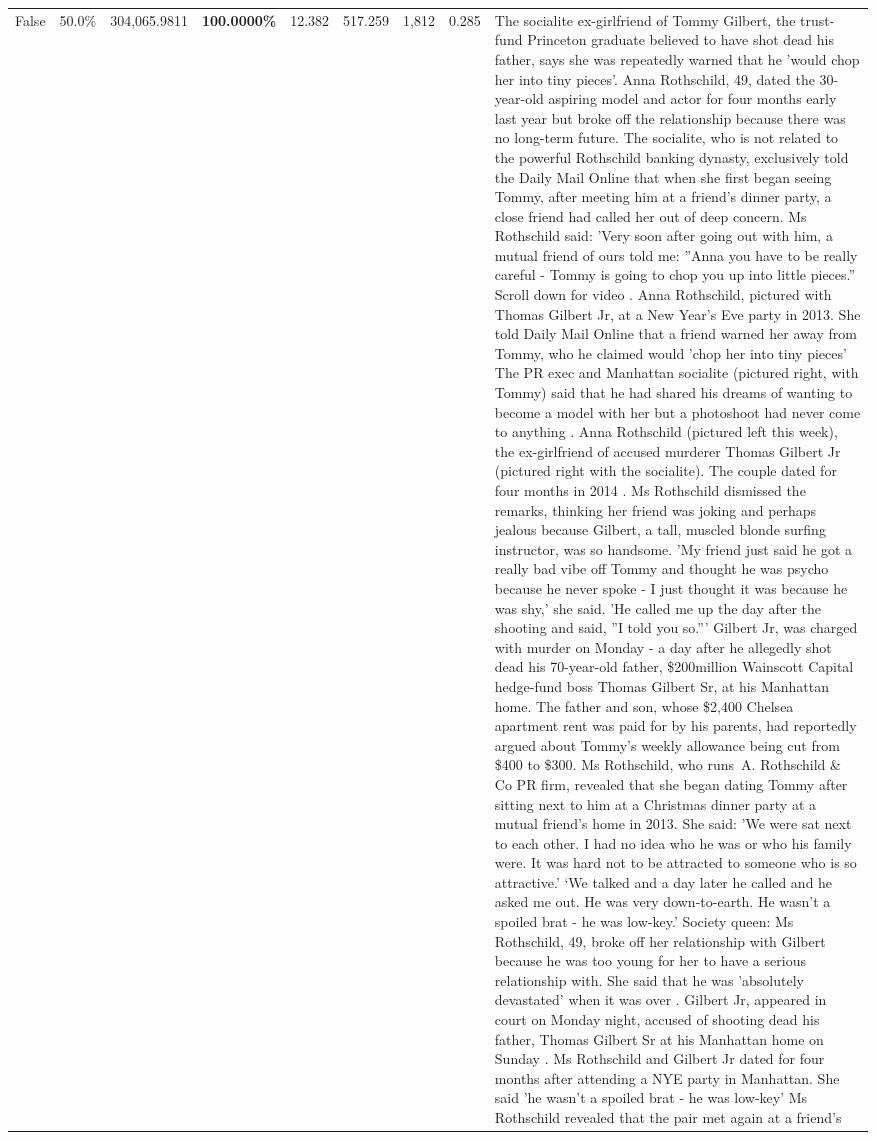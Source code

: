 \begin{table}[H]
\begin{tabular}{lllrlllll}
False & 50.0\% & \color{red} 304,065.9811 & \bfseries \color{red} 100.0000\% & 12.382 & 517.259 & 1,812 & 0.285 & The socialite ex-girlfriend of Tommy Gilbert, the trust-fund Princeton graduate believed to have shot dead his father, says she was repeatedly warned that he 'would chop her into tiny pieces'. Anna Rothschild, 49, dated the 30-year-old aspiring model and actor for four months early last year but broke off the relationship because there was no long-term future. The socialite, who is not related to the powerful Rothschild banking dynasty, exclusively told the Daily Mail Online that when she first began seeing Tommy, after meeting him at a friend's dinner party, a close friend had called her out of deep concern. Ms Rothschild said: 'Very soon after going out with him, a mutual friend of ours told me: ''Anna you have to be really careful - Tommy is going to chop you up into little pieces.'' Scroll down for video . Anna Rothschild, pictured with Thomas Gilbert Jr, at a New Year's Eve party in 2013. She told Daily Mail Online that a friend warned her away from Tommy, who he claimed would 'chop her into tiny pieces' The PR exec and Manhattan socialite (pictured right, with Tommy) said that he had shared his dreams of wanting to become a model with her but a photoshoot had never come to anything . Anna Rothschild (pictured left this week), the ex-girlfriend of accused murderer Thomas Gilbert Jr (pictured right with the socialite). The couple dated for four months in 2014 . Ms Rothschild dismissed the remarks, thinking her friend was joking and perhaps jealous because Gilbert, a tall, muscled blonde surfing instructor, was so handsome. 'My friend just said he got a really bad vibe off Tommy and thought he was psycho because he never spoke - I just thought it was because he was shy,' she said. 'He called me up the day after the shooting and said, ''I told you so.''' Gilbert Jr, was charged with murder on Monday - a day after he allegedly shot dead his 70-year-old father, \$200million Wainscott Capital hedge-fund boss Thomas Gilbert Sr, at his Manhattan home. The father and son, whose \$2,400 Chelsea apartment rent was paid for by his parents, had reportedly argued about Tommy's weekly allowance being cut from \$400 to \$300. Ms Rothschild, who runs A. Rothschild \& Co PR firm, revealed that she began dating Tommy after sitting next to him at a Christmas dinner party at a mutual friend's home in 2013. She said: 'We were sat next to each other. I had no idea who he was or who his family were. It was hard not to be attracted to someone who is so attractive.' ‘We talked and a day later he called and he asked me out. He was very down-to-earth. He wasn’t a spoiled brat - he was low-key.’ Society queen: Ms Rothschild, 49, broke off her relationship with Gilbert because he was too young for her to have a serious relationship with. She said that he was 'absolutely devastated' when it was over . Gilbert Jr, appeared in court on Monday night, accused of shooting dead his father, Thomas Gilbert Sr at his Manhattan home on Sunday . Ms Rothschild and Gilbert Jr dated for four months after attending a NYE party in Manhattan. She said 'he wasn't a spoiled brat - he was low-key' Ms Rothschild revealed that the pair met again at a friend’s 
\end{tabular}
\end{table}
